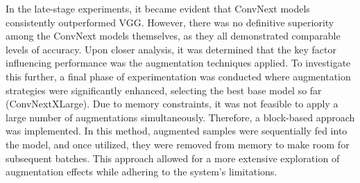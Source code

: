 \documentclass[11pt]{article}
\begin{document}
\begin{multicols}{2}
         In the late-stage experiments, it became evident that ConvNext models consistently outperformed VGG. However, there was no definitive superiority among the ConvNext models themselves, as they all demonstrated comparable levels of accuracy. Upon closer analysis, it was determined that the key factor influencing performance was the augmentation techniques applied.
         To investigate this further, a final phase of experimentation was conducted where augmentation strategies were significantly enhanced, selecting the best base model so far (ConvNextXLarge). Due to memory constraints, it was not feasible to apply a large number of augmentations simultaneously. Therefore, a block-based approach was implemented. In this method, augmented samples were sequentially fed into the model, and once utilized, they were removed from memory to make room for subsequent batches. This approach allowed for a more extensive exploration of augmentation effects while adhering to the system's limitations.
        

\end{multicols}
\end{document}
